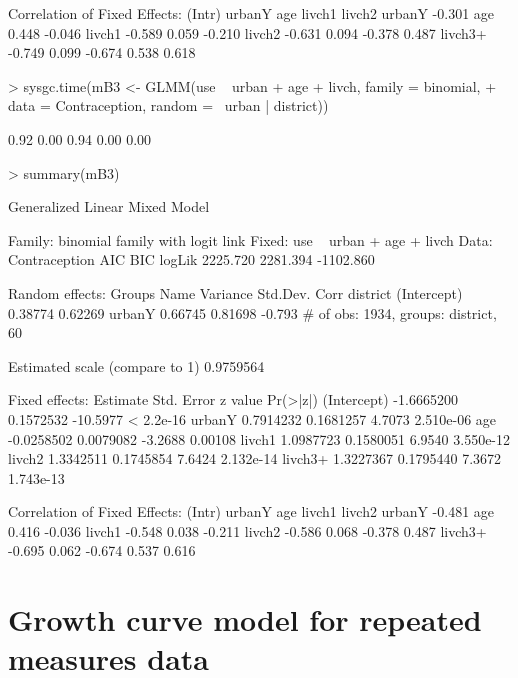 \documentclass[12pt]{article}
\begin{document}
\begin{Schunk}
\begin{Soutput}
Correlation of Fixed Effects:
        (Intr) urbanY age    livch1 livch2
urbanY  -0.301                            
age      0.448 -0.046                     
livch1  -0.589  0.059 -0.210              
livch2  -0.631  0.094 -0.378  0.487       
livch3+ -0.749  0.099 -0.674  0.538  0.618
\end{Soutput}
\begin{Sinput}
> sysgc.time(mB3 <- GLMM(use ~ urban + age + livch, family = binomial, 
+     data = Contraception, random = ~urban | district))
\end{Sinput}
\begin{Soutput}
[1] 0.92 0.00 0.94 0.00 0.00
\end{Soutput}
\begin{Sinput}
> summary(mB3)
\end{Sinput}
\begin{Soutput}
Generalized Linear Mixed Model

Family: binomial family with logit link
Fixed: use ~ urban + age + livch 
Data: Contraception 
      AIC      BIC    logLik
 2225.720 2281.394 -1102.860

Random effects:
 Groups   Name        Variance Std.Dev. Corr   
 district (Intercept) 0.38774  0.62269         
          urbanY      0.66745  0.81698  -0.793 
# of obs: 1934, groups: district, 60

Estimated scale (compare to 1)  0.9759564 

Fixed effects:
              Estimate Std. Error  z value  Pr(>|z|)
(Intercept) -1.6665200  0.1572532 -10.5977 < 2.2e-16
urbanY       0.7914232  0.1681257   4.7073 2.510e-06
age         -0.0258502  0.0079082  -3.2688   0.00108
livch1       1.0987723  0.1580051   6.9540 3.550e-12
livch2       1.3342511  0.1745854   7.6424 2.132e-14
livch3+      1.3227367  0.1795440   7.3672 1.743e-13

Correlation of Fixed Effects:
        (Intr) urbanY age    livch1 livch2
urbanY  -0.481                            
age      0.416 -0.036                     
livch1  -0.548  0.038 -0.211              
livch2  -0.586  0.068 -0.378  0.487       
livch3+ -0.695  0.062 -0.674  0.537  0.616
\end{Soutput}
\end{Schunk}


\section{Growth curve model for repeated measures data}
\label{sec:GrowthCurve}
\end{document}
